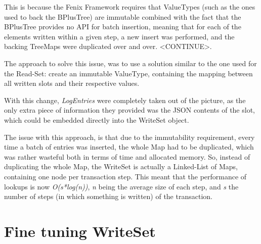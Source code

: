 This is because the Fenix Framework requires that ValueTypes (such as
the ones used to back the BPlusTree) are immutable combined with the
fact that the BPlusTree provides no API for batch insertion, meaning
that for each of the elements written within a given step, a new
insert was performed, and the backing TreeMaps were duplicated over
and over. <CONTINUE>.

The approach to solve this issue, was to use a solution similar to the
one used for the Read-Set: create an immutable ValueType, containing
the mapping between all written slots and their respective values.

With this change, {\it LogEntries} were completely taken out of the
picture, as the only extra piece of information they provided was the
JSON contents of the slot, which could be embedded directly into the
WriteSet object.

The issue with this approach, is that due to the immutability
requirement, every time a batch of entries was inserted, the whole Map
had to be duplicated, which was rather wasteful both in terms of time
and allocated memory. So, instead of duplicating the whole Map, the
WriteSet is actually a Linked-List of Maps, containing one node per
transaction step. This meant that the performance of lookups is now
{\it O(s*log(n))}, {\it n} being the average size of each step, and
{\it s} the number of steps (in which something is written) of the
transaction.

\section{Fine tuning WriteSet}

